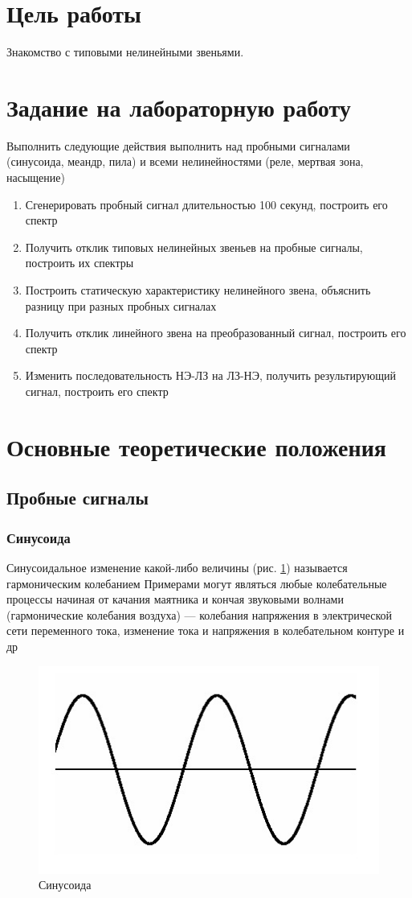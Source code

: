 \section{Цель работы}
Знакомство с типовыми нелинейными звеньями.
\section{Задание на лабораторную работу}
Выполнить следующие действия выполнить над пробными сигналами (синусоида, меандр, пила) и всеми 
нелинейностями (реле, мертвая зона, насыщение)
\begin{enumerate}
	\item Сгенерировать пробный сигнал длительностью 100 секунд, построить его спектр
	\item Получить отклик типовых нелинейных звеньев на пробные сигналы, построить их спектры
	\item Построить статическую характеристику нелинейного звена, объяснить разницу при разных пробных сигналах
	\item Получить отклик линейного звена на преобразованный сигнал, построить его спектр
	\item Изменить последовательность НЭ-ЛЗ на ЛЗ-НЭ, получить результирующий сигнал, построить его спектр
\end{enumerate}
\section{Основные теоретические положения}
\subsection{Пробные сигналы}
\subsubsection{Синусоида}
Синусоидальное изменение какой-либо величины (рис. \ref{fig:1}) называется гармоническим колебанием 
Примерами могут являться любые колебательные процессы начиная от качания маятника и кончая звуковыми волнами 
(гармонические колебания воздуха) — колебания напряжения в электрической сети переменного тока, 
изменение тока и напряжения в колебательном контуре и др
\begin{figure}[H]
	\centering
	\includegraphics[width=0.5\linewidth]{body/templates/sine.png}
	\caption{Синусоида}
	\label{fig:1}
\end{figure}


